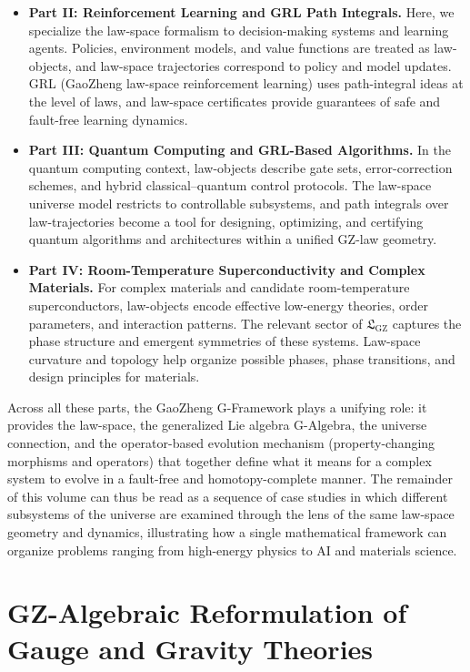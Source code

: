 \documentclass[11pt]{book}
\newcommand{\GAlgebra}{\text{G-Algebra}}
\newcommand{\GZLS}{\ensuremath{\mathfrak{L}_{\mathrm{GZ}}}}
\theoremstyle{plain}
\theoremstyle{definition}
\theoremstyle{remark}
\begin{document}
\begin{itemize}
  \item \textbf{Part II: Reinforcement Learning and GRL Path Integrals.}
        Here, we specialize the law-space formalism to decision-making
        systems and learning agents. Policies, environment models,
        and value functions are treated as law-objects, and
        law-space trajectories correspond to policy and model updates.
        GRL (GaoZheng law-space reinforcement learning) uses
        path-integral ideas at the level of laws, and law-space
        certificates provide guarantees of safe and fault-free
        learning dynamics.
  \item \textbf{Part III: Quantum Computing and GRL-Based Algorithms.}
        In the quantum computing context, law-objects describe
        gate sets, error-correction schemes, and hybrid
        classical--quantum control protocols. The law-space universe
        model restricts to controllable subsystems, and path
        integrals over law-trajectories become a tool for designing,
        optimizing, and certifying quantum algorithms and
        architectures within a unified GZ-law geometry.
  \item \textbf{Part IV: Room-Temperature Superconductivity and Complex Materials.}
        For complex materials and candidate room-temperature
        superconductors, law-objects encode effective low-energy
        theories, order parameters, and interaction patterns. The
        relevant sector of $\GZLS$ captures the phase structure and
        emergent symmetries of these systems. Law-space curvature
        and topology help organize possible phases, phase transitions,
        and design principles for materials.
\end{itemize}

Across all these parts, the GaoZheng G-Framework plays a unifying
role: it provides the law-space, the generalized Lie algebra
$\GAlgebra$, the universe connection, and the operator-based
evolution mechanism (property-changing morphisms and operators)
that together define what it means for a complex system to evolve
in a fault-free and homotopy-complete manner. The remainder of this
volume can thus be read as a sequence of case studies in which
different subsystems of the universe are examined through the lens
of the same law-space geometry and dynamics, illustrating how a
single mathematical framework can organize problems ranging from
high-energy physics to AI and materials science.

\chapter[GZ-Algebraic Reformulation of Gauge and Gravity Theories]{GZ-Algebraic Reformulation of Gauge and Gravity Theories}
\label{chap:gz-gauge-gravity}
\end{document}

